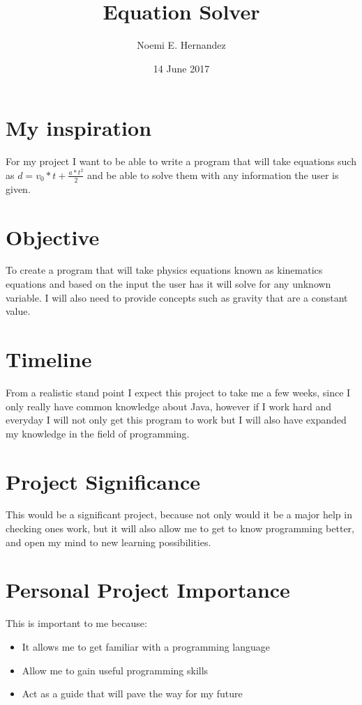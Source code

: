 \documentclass{article}
\title{Equation Solver}
\author{Noemi E. Hernandez}
\date{14 June 2017}
\begin{document}
	\maketitle
	
	\section*{My inspiration}
		\hspace{.5 in}For my project I want to be able to write a program that will take equations such as $ d = v_0 * t + \frac{a* t^2}{2}$ and be able to solve them with any information the user is given. 
		
	\section*{Objective}
		\hspace*{.5 in}To create a program that will take physics equations known as kinematics equations and based on the input the user has it will solve for any unknown variable. I will also need to provide concepts such as gravity that are a constant value.
	
	\section*{Timeline}
		\hspace*{.5 in}From a realistic stand point I expect this project to take me a few weeks, since I only really have common knowledge about Java, however if I work hard and everyday I will not only get this program to work but I will also have expanded my knowledge in the field of programming.
	
	\section*{Project Significance}
		\hspace*{.5 in}This would be a significant project, because not only would it be a major help in checking ones work, but it will also allow me to get to know programming better, and open my mind to new learning possibilities.

	\section*{Personal Project Importance}
		This is important to me because:
		\begin{itemize}
			\item It allows me to get familiar with a programming language
			\item Allow me to gain useful programming skills
			\item Act as a guide that will pave the way for my future
		\end{itemize}
\end{document}

